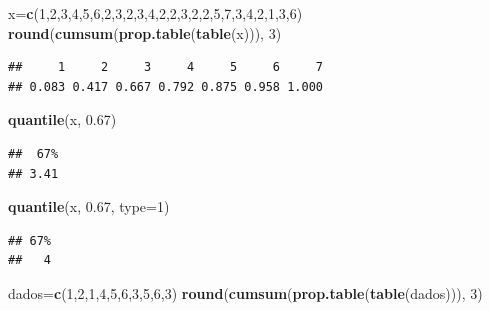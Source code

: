 \documentclass[]{book}
\newenvironment{Shaded}{\begin{snugshade}}{\end{snugshade}}
\newcommand{\DataTypeTok}[1]{\textcolor[rgb]{0.13,0.29,0.53}{#1}}
\newcommand{\DecValTok}[1]{\textcolor[rgb]{0.00,0.00,0.81}{#1}}
\newcommand{\FloatTok}[1]{\textcolor[rgb]{0.00,0.00,0.81}{#1}}
\newcommand{\KeywordTok}[1]{\textcolor[rgb]{0.13,0.29,0.53}{\textbf{#1}}}
\newcommand{\NormalTok}[1]{#1}
\theoremstyle{definition}
\theoremstyle{definition}
\theoremstyle{definition}
\theoremstyle{remark}
\begin{document}
\begin{Shaded}
\begin{Highlighting}[]
\NormalTok{x=}\KeywordTok{c}\NormalTok{(}\DecValTok{1}\NormalTok{,}\DecValTok{2}\NormalTok{,}\DecValTok{3}\NormalTok{,}\DecValTok{4}\NormalTok{,}\DecValTok{5}\NormalTok{,}\DecValTok{6}\NormalTok{,}\DecValTok{2}\NormalTok{,}\DecValTok{3}\NormalTok{,}\DecValTok{2}\NormalTok{,}\DecValTok{3}\NormalTok{,}\DecValTok{4}\NormalTok{,}\DecValTok{2}\NormalTok{,}\DecValTok{2}\NormalTok{,}\DecValTok{3}\NormalTok{,}\DecValTok{2}\NormalTok{,}\DecValTok{2}\NormalTok{,}\DecValTok{5}\NormalTok{,}\DecValTok{7}\NormalTok{,}\DecValTok{3}\NormalTok{,}\DecValTok{4}\NormalTok{,}\DecValTok{2}\NormalTok{,}\DecValTok{1}\NormalTok{,}\DecValTok{3}\NormalTok{,}\DecValTok{6}\NormalTok{)}
\KeywordTok{round}\NormalTok{(}\KeywordTok{cumsum}\NormalTok{(}\KeywordTok{prop.table}\NormalTok{(}\KeywordTok{table}\NormalTok{(x))), }\DecValTok{3}\NormalTok{)}
\end{Highlighting}
\end{Shaded}

\begin{verbatim}
##     1     2     3     4     5     6     7 
## 0.083 0.417 0.667 0.792 0.875 0.958 1.000
\end{verbatim}

\begin{Shaded}
\begin{Highlighting}[]
\KeywordTok{quantile}\NormalTok{(x, }\FloatTok{0.67}\NormalTok{)}
\end{Highlighting}
\end{Shaded}

\begin{verbatim}
##  67% 
## 3.41
\end{verbatim}

\begin{Shaded}
\begin{Highlighting}[]
\KeywordTok{quantile}\NormalTok{(x, }\FloatTok{0.67}\NormalTok{, }\DataTypeTok{type=}\DecValTok{1}\NormalTok{)}
\end{Highlighting}
\end{Shaded}

\begin{verbatim}
## 67% 
##   4
\end{verbatim}

\begin{Shaded}
\begin{Highlighting}[]
\NormalTok{dados=}\KeywordTok{c}\NormalTok{(}\DecValTok{1}\NormalTok{,}\DecValTok{2}\NormalTok{,}\DecValTok{1}\NormalTok{,}\DecValTok{4}\NormalTok{,}\DecValTok{5}\NormalTok{,}\DecValTok{6}\NormalTok{,}\DecValTok{3}\NormalTok{,}\DecValTok{5}\NormalTok{,}\DecValTok{6}\NormalTok{,}\DecValTok{3}\NormalTok{)}
\KeywordTok{round}\NormalTok{(}\KeywordTok{cumsum}\NormalTok{(}\KeywordTok{prop.table}\NormalTok{(}\KeywordTok{table}\NormalTok{(dados))), }\DecValTok{3}\NormalTok{)}
\end{Highlighting}
\end{Shaded}
\end{document}
